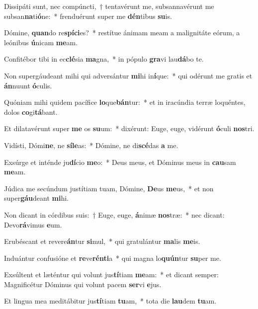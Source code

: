 \item Dissipáti sunt, nec compúncti,~† tentavérunt me, subsannavérunt me subsan\textbf{na}ti\textbf{ó}ne:~* frenduérunt super me \textbf{dén}tibus \textbf{su}is.
\item Dómine, \textbf{quan}do re\textbf{spí}\textbf{ci}es?~* restítue ánimam meam a malignitáte eórum, a leónibus \textbf{ú}nicam \textbf{me}am.
\item Confitébor tibi in ec\textbf{clé}sia \textbf{ma}gna,~* in pópulo \textbf{gra}vi lau\textbf{dá}bo te.
\item Non supergáudeant mihi qui adversántur \textbf{mi}hi in\textbf{í}que:~* qui odérunt me gratis et \textbf{án}nuunt \textbf{ó}culis.
\item Quóniam mihi quidem pacífice \textbf{lo}que\textbf{bán}tur:~* et in iracúndia terræ loquéntes, dolos \textbf{co}gi\textbf{tá}bant.
\item Et dilatavérunt super \textbf{me} os \textbf{su}um:~* dixérunt: Euge, euge, vidérunt \textbf{ó}culi \textbf{nos}tri.
\item Vidísti, Dómi\textbf{ne}, ne \textbf{sí}\textbf{le}as:~* Dómine, ne di\textbf{scé}das \textbf{a} me.
\item Exsúrge et inténde ju\textbf{dí}cio \textbf{me}o:~* Deus meus, et Dóminus meus in \textbf{cau}sam \textbf{me}am.
\item Júdica me secúndum justítiam tuam, Dómine, \textbf{De}us \textbf{me}us,~* et non super\textbf{gáu}deant \textbf{mi}hi.
\item Non dicant in córdibus suis:~† Euge, euge, \textbf{á}nimæ \textbf{nos}træ:~* nec dicant: Devo\textbf{rá}vimus \textbf{e}um.
\item Erubéscant et revere\textbf{án}tur \textbf{si}mul,~* qui gratulántur \textbf{ma}lis \textbf{me}is.
\item Induántur confusióne et \textbf{re}ve\textbf{rén}\textbf{ti}a~* qui magna lo\textbf{quún}tur \textbf{su}per me.
\item Exsúltent et læténtur qui volunt jus\textbf{tí}tiam \textbf{me}am:~* et dicant semper: Magnificétur Dóminus qui volunt pacem \textbf{ser}vi \textbf{e}jus.
\item Et lingua mea meditábitur jus\textbf{tí}tiam \textbf{tu}am,~* tota die \textbf{lau}dem \textbf{tu}am.

